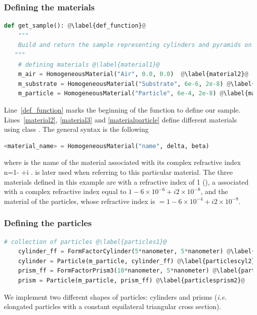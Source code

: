 \subsubsection{Defining the materials} 

\begin{lstlisting}[language=python, style=eclipseboxed,name=ex1,nolol]
def get_sample(): @\label{def_function}@
    """
    Build and return the sample representing cylinders and pyramids on top of substrate without interference.
   """
    # defining materials @\label{material1}@
    m_air = HomogeneousMaterial("Air", 0.0, 0.0)  @\label{material2}@
    m_substrate = HomogeneousMaterial("Substrate", 6e-6, 2e-8) @\label{material3}@
    m_particle = HomogeneousMaterial("Particle", 6e-4, 2e-8) @\label{materialparticle}@

\end{lstlisting}
Line~\ref{def_function} marks the beginning of the
function to define our sample. Lines~\ref{material2}, \ref{material3} and \ref{materialparticle} define different
materials using class . The general syntax is the following 
\begin{lstlisting}[language=python, style=eclipse,numbers=none]
<material_name> = HomogeneousMaterial("name", delta, beta)
\end{lstlisting}
where  is the name of the
material associated with its complex refractive index
n=1- +i .  is later used when
referring to this particular material. The three materials defined in this example are  with a refractive
index of 1 (), a  associated with a complex refractive index
equal to $1-6\times 10^{-6} +i2\times 10^{-8} $, and the material of the particles, whose refractive index is $=1-6\times 10^{-4}+i2\times 10^{-8}$.

\subsubsection{Defining the particles}
\begin{lstlisting}[language=python,style=eclipseboxed,name=ex1,nolol]
    # collection of particles @\label{particles1}@
    cylinder_ff = FormFactorCylinder(5*nanometer, 5*nanometer) @\label{particlescyl1}@
    cylinder = Particle(m_particle, cylinder_ff) @\label{particlescyl2}@
    prism_ff = FormFactorPrism3(10*nanometer, 5*nanometer) @\label{particlesprism1}@
    prism = Particle(m_particle, prism_ff) @\label{particlesprism2}@
\end{lstlisting}
We implement two different shapes of particles: cylinders and
prisms (\textit{i.e.} elongated particles with a constant equilateral triangular cross section).
 
